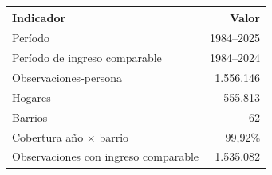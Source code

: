 \documentclass{article}
\begin{document}
\begin{table}
\centering
\small
\begin{tabular}{lr}
\toprule
\textbf{Indicador} & \textbf{Valor} \\
\midrule
Período & 1984--2025 \\
Período de ingreso comparable & 1984--2024 \\
Observaciones-persona & 1.556.146 \\
Hogares & 555.813 \\
Barrios & 62 \\
Cobertura año $\times$ barrio & 99,92\% \\
Observaciones con ingreso comparable & 1.535.082 \\
\bottomrule
\end{tabular}
\end{table}
\end{document}
